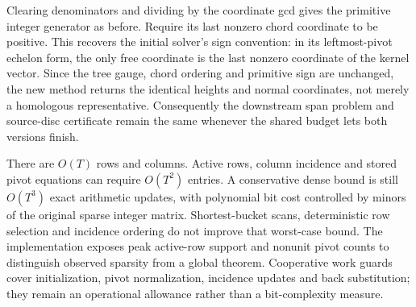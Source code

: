 Clearing denominators and dividing by the coordinate gcd gives the primitive
integer generator as before. Require its last nonzero chord coordinate to
be positive. This recovers the initial solver's sign convention: in its
leftmost-pivot echelon form, the only free coordinate is the last nonzero
coordinate of the kernel vector. Since the tree gauge, chord ordering and
primitive sign are unchanged, the new method returns the identical heights
and normal coordinates, not merely a homologous representative. Consequently
the downstream span problem and source-disc certificate remain the same
whenever the shared budget lets both versions finish.

There are $O(T)$ rows and columns. Active rows, column incidence and stored
pivot equations can require $O(T^2)$ entries. A conservative dense bound is
still $O(T^3)$ exact arithmetic updates, with polynomial bit cost controlled
by minors of the original sparse integer matrix. Shortest-bucket scans,
deterministic row selection and incidence ordering do not improve that
worst-case bound. The implementation exposes peak active-row support and
nonunit pivot counts to distinguish observed sparsity from a global theorem.
Cooperative work guards cover initialization, pivot normalization, incidence
updates and back substitution; they remain an operational allowance rather
than a bit-complexity measure.


